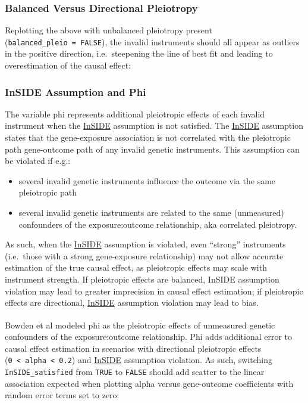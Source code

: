 \documentclass[
]{article}
\begin{document}
\newpage

\subsubsection{Balanced Versus Directional Pleiotropy}\label{balanced-versus-directional-pleiotropy}

\leavevmode\newline Replotting the above with unbalanced pleiotropy present (\texttt{balanced\_pleio\ =\ FALSE}), the invalid instruments should all appear as outliers in the positive direction, i.e.~steepening the line of best fit and leading to overestimation of the causal effect:

\newpage

\subsubsection{InSIDE Assumption and Phi}\label{inside-assumption-and-phi}

\leavevmode\newline The variable phi represents additional pleiotropic effects of each invalid instrument when the \hyperref[acronyms_InSIDE]{InSIDE} assumption is not satisfied. The \hyperref[acronyms_InSIDE]{InSIDE} assumption states that the gene-exposure association is not correlated with the pleiotropic path gene-outcome path of any invalid genetic instruments. This assumption can be violated if e.g.:

\begin{itemize}
\item
  several invalid genetic instruments influence the outcome via the same pleiotropic path
\item
  several invalid genetic instruments are related to the same (unmeasured) confounders of the exposure:outcome relationship, aka correlated pleiotropy.
\end{itemize}

As such, when the \hyperref[acronyms_InSIDE]{InSIDE} assumption is violated, even ``strong'' instruments (i.e.~those with a strong gene-exposure relationship) may not allow accurate estimation of the true causal effect, as pleiotropic effects may scale with instrument strength. If pleiotropic effects are balanced, InSIDE assumption violation may lead to greater imprecision in causal effect estimation; if pleiotropic effects are directional, \hyperref[acronyms_InSIDE]{InSIDE} assumption violation may lead to bias.

Bowden et al\textsuperscript{} modeled phi as the pleiotropic effects of unmeasured genetic confounders of the exposure:outcome relationship. Phi adds additional error to causal effect estimation in scenarios with directional pleiotropic effects (\texttt{0\ \textless{}\ alpha\ \textless{}\ 0.2}) and \hyperref[acronyms_InSIDE]{InSIDE} assumption violation. As such, switching \texttt{InSIDE\_satisfied} from \texttt{TRUE} to \texttt{FALSE} should add scatter to the linear association expected when plotting alpha versus gene-outcome coefficients with random error terms set to zero:
\end{document}
